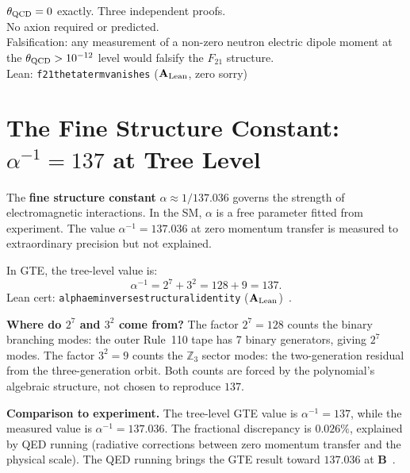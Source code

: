 \documentclass[11pt,a4paper]{article}
\newcommand{\term}[1]{\textbf{#1}}
\newcommand{\lean}[1]{%
  \penalty-100
  \begingroup\def\_{\textunderscore\allowbreak}\texttt{#1}\endgroup}
\newcommand{\CatAL}{\ensuremath{\mathbf{A}_{\rm Lean}}}
\newcommand{\CatB}{\textbf{B}}
\begin{document}
\begin{tcolorbox}[colback=boxorange,colframe=orange!60!black,
  title={Result: Strong CP Vanishes (\CatAL)}]
$\theta_{\rm QCD} = 0$ exactly. Three independent proofs.\\[2pt]
No axion required or predicted.\\[2pt]
Falsification: any measurement of a non-zero neutron electric dipole moment
at the $\theta_{\rm QCD} > 10^{-12}$ level would falsify the $F_{21}$
structure.\\[2pt]
Lean: \lean{f21\_theta\_term\_vanishes} (\CatAL, zero sorry)
\end{tcolorbox}

\section{The Fine Structure Constant: $\alpha^{-1} = 137$ at Tree Level}
\label{sec:alpha}

The \term{fine structure constant} $\alpha \approx 1/137.036$ governs the strength
of electromagnetic interactions.
In the SM, $\alpha$ is a free parameter fitted from experiment.
The value $\alpha^{-1} = 137.036$ at zero momentum transfer is measured to
extraordinary precision but not explained.

In GTE, the tree-level value is:
\begin{equation}
  \alpha^{-1} = 2^7 + 3^2 = 128 + 9 = 137.
  \label{eq:alpha}
\end{equation}
Lean cert: \lean{alpha\_em\_inverse\_structural\_identity} (\CatAL)~\cite{SpivackGTECompleteFramework}.

\textbf{Where do $2^7$ and $3^2$ come from?}
The factor $2^7 = 128$ counts the binary branching modes: the outer Rule~110 tape
has 7 binary generators, giving $2^7$ modes.
The factor $3^2 = 9$ counts the $\mathbb{Z}_3$ sector modes: the two-generation
residual from the three-generation orbit.
Both counts are forced by the polynomial's algebraic structure, not chosen to
reproduce $137$.

\textbf{Comparison to experiment.}
The tree-level GTE value is $\alpha^{-1} = 137$, while the measured value is
$\alpha^{-1} = 137.036$.
The fractional discrepancy is $0.026\%$, explained by QED running (radiative
corrections between zero momentum transfer and the physical scale).
The QED running brings the GTE result toward $137.036$ at \CatB~\cite{SpivackGTECompleteFramework}.
\end{document}
